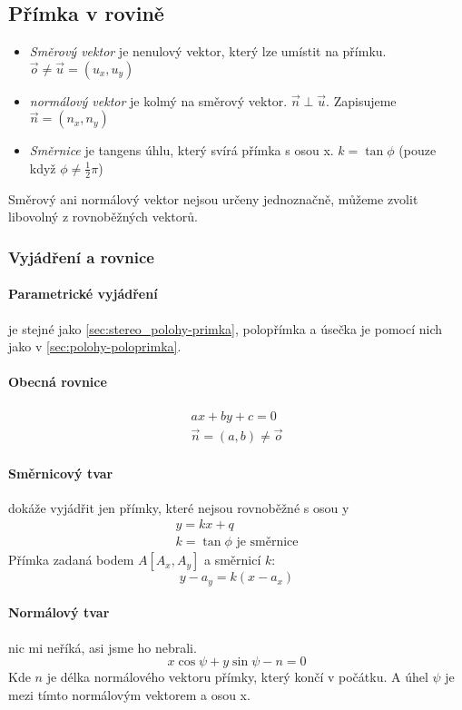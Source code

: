 \documentclass[12pt]{article}
\begin{document}
\subsection{Přímka v rovině}
\begin{itemize}
\item \emph{Směrový vektor} je nenulový vektor, který lze umístit na přímku. $ \vec{o} \neq\vec{u} = (u_x, u_y)$
\item \emph{normálový vektor} je kolmý na směrový vektor. $ \vec{n} \perp \vec{u}$. Zapisujeme $\vec{n} = (n_x, n_y)$
\item \emph{Směrnice} je tangens úhlu, který svírá přímka s osou x. $k = \tan \phi$ (pouze když $\phi \neq \frac{1}{2} \pi$)
\end{itemize}
Směrový ani normálový vektor nejsou určeny jednoznačně, můžeme zvolit libovolný z rovnoběžných vektorů.
\subsubsection{Vyjádření a rovnice}
\paragraph{Parametrické vyjádření} je stejné jako \ref{sec:stereo_polohy-primka}, polopřímka a úsečka je pomocí nich jako v \ref{sec:polohy-poloprimka}.
\paragraph{Obecná rovnice}
\begin{align}
ax +by +c = 0\\
\vec{n} = (a,b) \neq \vec{o}
\end{align}
\paragraph{Směrnicový tvar} dokáže vyjádřit jen přímky, které nejsou rovnoběžné s osou y
\begin{align}
y = k x + q\\
k = \tan \phi \text{ je směrnice}
\end{align}
Přímka zadaná bodem $A[A_x,A_y]$ a směrnicí $k$:
\begin{equation}
y - a_y = k(x -a_x)
\end{equation}
\paragraph{Normálový tvar} nic mi neříká, asi jsme ho nebrali.
\begin{equation}
x \cos \psi + y \sin \psi - n = 0
\end{equation}
Kde $n$ je délka normálového vektoru přímky, který končí v počátku. A úhel $\psi$ je mezi tímto normálovým vektorem a osou x.
\end{document}

